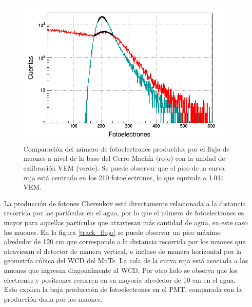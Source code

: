 \documentclass[12pt,oneside,openany,letter]{book}
\begin{document}
\begin{figure}[h]
\centering
\includegraphics[scale=0.4]{images/vem_muflujo.png}
\caption[Comparaci\'on del n\'umero de fotoelectrones producidos por el flujo de muones a nivel de la base del Cerro Mach\'in con la unidad de calibraci\'on VEM]{Comparaci\'on del n\'umero de fotoelectrones producidos por el flujo de muones a nivel de la base del Cerro Mach\'in (rojo) con la unidad de calibraci\'on VEM (verde). Se puede observar que el pico de la curva roja est\'a centrado en los 210 fotoelectrones, lo que equivale a 1.034 VEM.  
\label{vem_muflujo}}
\end{figure}

La producción de fotones Cherenkov está directamente relacionada a la distancia recorrida por las partículas en el agua, por lo que el número de fotoelectrones es mayor para aquellas partículas que atraviesan más cantidad de agua, en este caso los muones. En la figura \ref{track_flujo} se puede observar un pico máximo alrededor de 120 cm que corresponde a la distancia recorrida por los muones que atraviesan el detector de manera vertical, o incluso de manera horizontal por la geometr\'ia c\'ubica del WCD del MuTe. La cola de la curva roja está asociada a los muones que ingresan diagonalmente al WCD. Por otro lado se observa que los electrones y positrones recorren en su mayoría alrededor de 10 cm en el agua. Esto explica la baja producci\'on de fotoelectrones en el PMT, comparada con la producci\'on dada por los muones. 
\end{document}
